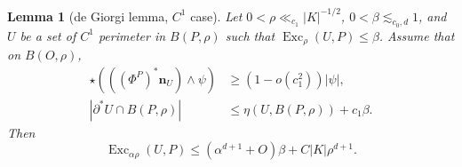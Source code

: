 \documentclass[reqno,10pt]{amsart}
\DeclareMathOperator{\Exc}{Exc}
\newcommand{\normal}{\mathbf n}
\newtheorem{lemma}[theorem]{Lemma}
\theoremstyle{definition}
\numberwithin{equation}{section}
\begin{document}
\begin{lemma}[de Giorgi lemma, $C^1$ case]\label{Miranda44}
Let $0 < \rho \ll_{c_1} |K|^{-1/2}$, $0 < \beta \lesssim_{c_0, d} 1$, and $U$ be a set of $C^1$ perimeter in $B(P, \rho)$ such that $\Exc_\rho (U, P) \leq \beta$.
Assume that on $B(O, \rho)$,
\begin{align}
\star(((\Phi^P)^* \normal_U) \wedge \psi) &\geq (1 - o(c_1^2)) |\psi|, \label{Miranda44 normal hyp} \\
|\partial^* U \cap B(P, \rho)| &\leq \eta(U, B(P, \rho)) + c_1 \beta. \label{Miranda44 minimality hyp}
\end{align}
Then
\begin{equation}\label{Miranda44 concl}
\Exc_{\alpha \rho} (U, P) \leq (\alpha^{d + 1} + O) \beta + C|K|\rho^{d + 1}.
\end{equation}
\end{lemma}
\end{document}
